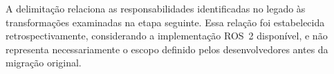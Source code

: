 A delimitação relaciona as responsabilidades identificadas no legado às transformações examinadas na etapa seguinte. Essa relação foi estabelecida retrospectivamente, considerando a implementação ROS~2 disponível, e não representa necessariamente o escopo definido pelos desenvolvedores antes da migração original.

